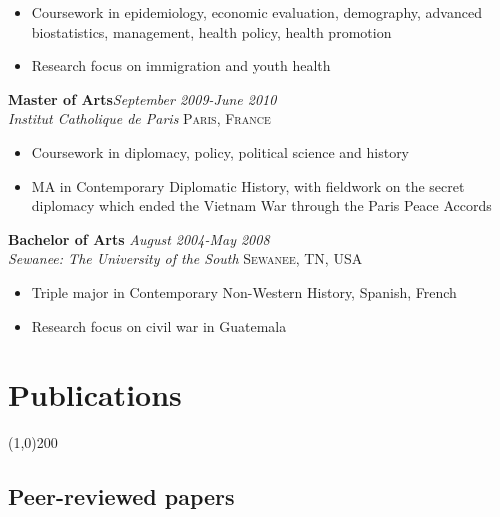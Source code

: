 \documentclass[11pt]{article}
\begin{document}
\vspace{-2mm}
\begin{itemize}\itemsep0pt \parskip0pt 
\item Coursework in epidemiology, economic evaluation, demography, advanced biostatistics, management, health policy, health promotion
\item Research focus on immigration and youth health 
\end{itemize}


\noindent \textbf{Master of Arts}\hfill \emph{September 2009-June 2010}\\
\noindent \emph{Institut Catholique de Paris} \hfill \textsc{Paris, France}
\vspace{-2mm}
\begin{itemize}\itemsep0pt \parskip0pt 
\item Coursework in diplomacy, policy, political science and history
\item MA in Contemporary Diplomatic History, with fieldwork on the secret diplomacy which ended the Vietnam War through the Paris Peace Accords
\end{itemize}

\noindent \textbf{Bachelor of Arts} \hfill \emph{August 2004-May 2008}\\
\noindent \emph{Sewanee: The University of the South} \hfill \textsc{Sewanee, TN, USA}
\vspace{-2mm}
\begin{itemize}\itemsep0pt \parskip0pt 
\item Triple major in Contemporary Non-Western History, Spanish, French
\item Research focus on civil war in Guatemala
\end{itemize}


\newpage

\section*{Publications} %
\vspace{-7mm}
\line(1,0){200}
\vspace{2mm}


\subsection*{Peer-reviewed papers}
\end{document}
